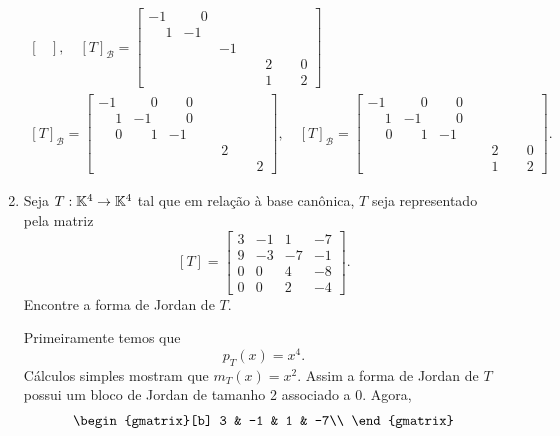 \begin{exemplo}
\begin{enumerate}
\begin{solucao}
\begin{align*}
\begin{bmatrix}
				\end{bmatrix}, \quad [T]_\mathcal{B} = \begin{bmatrix}
					-1 & \phantom{-}0 & & &\\
					\phantom{-}1 & -1 & & & \\
					\phantom{-1} &  & -1 & &\\
					& & & \phantom{-}2 & \phantom{-}0\\
					& & & \phantom{-}1 & \phantom{-}2
				\end{bmatrix}\\
				[T]_\mathcal{B} = \begin{bmatrix}
					-1 & \phantom{-}0 & \phantom{-}0 & &\\
					\phantom{-}1 & -1 & \phantom{-}0 & & \\
					\phantom{-} 0 & \phantom{-}1 & -1 & &\\
					& & & \phantom{-}2 & \\
					& & & & \phantom{-}2
				\end{bmatrix}, \quad [T]_\mathcal{B} = \begin{bmatrix}
					-1 & \phantom{-}0 & \phantom{-}0 & &\\
					\phantom{-}1 & -1 & \phantom{-}0 & & \\
					\phantom{-1}0 & \phantom{-}1 & -1 & &\\
					& & & \phantom{-}2 & \phantom{-}0\\
					& & & \phantom{-}1 & \phantom{-}2
				\end{bmatrix}.
			\end{align*}
		\end{solucao}
		\item Seja $T : \mathbb{K}^4 \to \mathbb{K}^4$ tal que em rela\c{c}\~ao \`a base can\^onica, $T$ seja representado pela matriz
		\[
			[T] = \begin{bmatrix}
				3 & -1 & 1 & -7\\
				9 & -3 & -7 & -1\\
				0 & 0 & 4 & -8\\
				0 & 0 & 2 & -4
			\end{bmatrix}.
		\]
		Encontre a forma de Jordan de $T$.
		\begin{solucao}
			Primeiramente temos que
			\[
				p_T(x) = x^4.
			\]
			C\'alculos simples mostram que $m_T(x) = x^2$. Assim a forma de Jordan de $T$ possui um bloco de Jordan de tamanho 2 associado a 0. Agora,
			\begin{align*}
				\begin{gmatrix}[b]
  					3 & -1 & 1 & -7\\

\end{gmatrix}
\end{align*}
\end{solucao}
\end{enumerate}
\end{exemplo}
